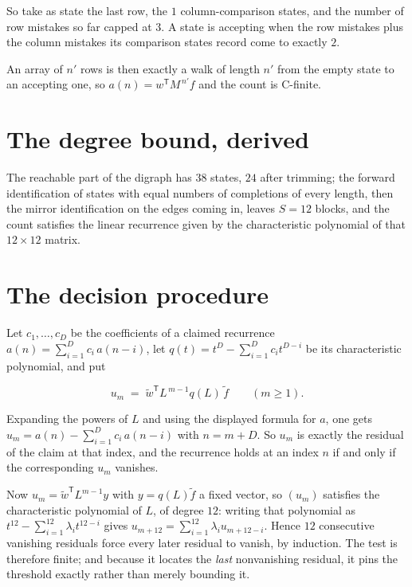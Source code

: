 \documentclass[11pt]{article}
\theoremstyle{definition}
\begin{document}
So take as state the last row, the $1$ column-comparison states, and the number of row mistakes so far capped at $3$. A state is accepting when the row mistakes plus the column mistakes its comparison states record come to exactly $2$.

An array of $n'$ rows is then exactly a walk of length $n'$ from the empty state to an accepting one, so $a(n) = w^{\mathsf T}M^{\,n'}f$ and the count is C-finite.

\section{The degree bound, derived}

The reachable part of the digraph has $38$ states, $24$ after trimming; the forward identification of states with equal numbers of completions of every length, then the mirror identification on the edges coming in, leaves $S = 12$ blocks, and the count satisfies the linear recurrence given by the characteristic polynomial of that $12\times12$ matrix.

\section{The decision procedure}

Let $c_1,\dots,c_D$ be the coefficients of a claimed recurrence $a(n) = \sum_{i=1}^{D} c_i\,a(n-i)$, let $q(t) = t^{D} - \sum_{i=1}^{D} c_i t^{D-i}$ be its characteristic polynomial, and put

\[u_m \;=\; \tilde w^{\mathsf T} L^{\,m-1} q(L)\,\tilde f \qquad (m \ge 1).\]

Expanding the powers of $L$ and using the displayed formula for $a$, one gets $u_m = a(n) - \sum_{i=1}^{D} c_i\,a(n-i)$ with $n = m + D$. So $u_m$ is exactly the residual of the claim at that index, and the recurrence holds at an index $n$ if and only if the corresponding $u_m$ vanishes.

Now $u_m = \tilde w^{\mathsf T} L^{m-1} y$ with $y = q(L)\tilde f$ a fixed vector, so $(u_m)$ satisfies the characteristic polynomial of $L$, of degree $12$: writing that polynomial as $t^{12} - \sum_{i=1}^{12} \lambda_i t^{12-i}$ gives $u_{m+12} = \sum_{i=1}^{12} \lambda_i u_{m+12-i}$. Hence $12$ consecutive vanishing residuals force every later residual to vanish, by induction. The test is therefore finite; and because it locates the {\itshape last} nonvanishing residual, it pins the threshold exactly rather than merely bounding it.
\end{document}
